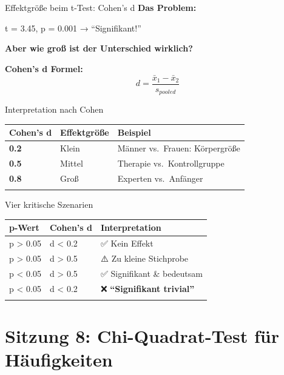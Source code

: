 \documentclass[
  ignorenonframetext,
]{beamer}
\newcounter{none} %
\begin{document}
\begin{frame}{Effektgröße beim t-Test: Cohen's d}
\protect{}\label{effektgruxf6uxdfe-beim-t-test-cohens-d}
\textbf{Das Problem:}

t = 3.45, p = 0.001 → ``Signifikant!''

\textbf{Aber wie groß ist der Unterschied wirklich?}

\textbf{Cohen's d Formel:}
\[d = \frac{\bar{x}_1 - \bar{x}_2}{s_{pooled}}\]
\end{frame}

\begin{frame}{Interpretation nach Cohen}
\protect{}\label{interpretation-nach-cohen}
{\def\LTcaptype{none} %
\begin{longtable}[]{@{}lll@{}}
\toprule\noalign{}
Cohen's d & Effektgröße & Beispiel \\
\midrule\noalign{}
\endhead
\textbf{0.2} & Klein & Männer vs.~Frauen: Körpergröße \\
\textbf{0.5} & Mittel & Therapie vs.~Kontrollgruppe \\
\textbf{0.8} & Groß & Experten vs.~Anfänger \\
\bottomrule\noalign{}
\end{longtable}
}
\end{frame}

\begin{frame}{Vier kritische Szenarien}
\protect{}\label{vier-kritische-szenarien}
{\def\LTcaptype{none} %
\begin{longtable}[]{@{}lll@{}}
\toprule\noalign{}
p-Wert & Cohen's d & Interpretation \\
\midrule\noalign{}
\endhead
p \textgreater{} 0.05 & d \textless{} 0.2 & ✅ Kein Effekt \\
p \textgreater{} 0.05 & d \textgreater{} 0.5 & ⚠️ Zu kleine
Stichprobe \\
p \textless{} 0.05 & d \textgreater{} 0.5 & ✅ Signifikant \&
bedeutsam \\
p \textless{} 0.05 & d \textless{} 0.2 & ❌ \textbf{``Signifikant
trivial''} \\
\bottomrule\noalign{}
\end{longtable}
}
\end{frame}

\section{Sitzung 8: Chi-Quadrat-Test für
Häufigkeiten}\label{sitzung-8-chi-quadrat-test-fuxfcr-huxe4ufigkeiten}
\end{document}
